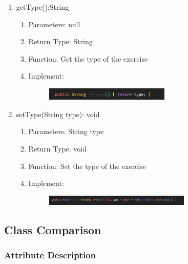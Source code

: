 \documentclass[16pt]{scrreprt}
\begin{document}
\begin{enumerate}
    \item getType():String
    \begin{enumerate}
        \item Parameters: null
        \item Return Type: String
        \item Function: Get the type of the exercise
        \item Implement:
        \begin{figure}[H]
    \centering
    \includegraphics[width=0.6\textwidth]{diagrams/ex-gettype.png}\\
\end{figure}
    \end{enumerate}
    
        \item setType(String type): void
    \begin{enumerate}
        \item Parameters: String type
        \item Return Type: void
        \item Function: Set the type of the exercise
        \item Implement:
        \begin{figure}[H]
    \centering
    \includegraphics[width=0.7\textwidth]{diagrams/ex-settype.png}\\
\end{figure}
    \end{enumerate}
\end{enumerate}
    
    
\subsection{Class Comparison}
\subsubsection{Attribute Description}
\end{document}
